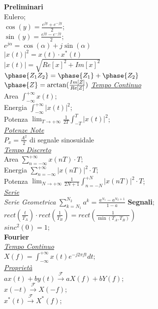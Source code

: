 \documentclass[a4paper]{article}
\begin{document}
\begin{multicols*}{3}
\textbf{Preliminari} \\
Eulero; \\
$\cos(y)=\frac{e^{jy} + e^{-jy}}{2}$; \\
$\sin(y)=\frac{e^{jy} - e^{-jy}}{2}$; \\
$e^{j\alpha}=\cos(\alpha)+j\sin(\alpha)$ \\
$|x(t)|^2=x(t)\cdot x^*(t)$\\
$|x(t)|=\sqrt{{Re[x]}^{2} + {Im[x]}^{2}}$ \\
$\phase{Z_1 Z_2} = \phase{Z_1}+\phase{Z_2}$ \\
$\phase{Z}=\arctan(\frac{Im[Z]}{Re[Z]})$
\underline{\textit{Tempo Continuo}} \\
Area $\int_{-\infty}^{+\infty} x(t)$; \\
Energia $\int_{-\infty}^{+\infty} |x(t)|^2$; \\
Potenza 
$\lim_{T \to +\infty}\frac{1}{2T}\int_{-T}^{T}|x(t)|^2$; \\
\underline{\textit{Potenze Note}} \\
$P_x=\frac{{A}^{2}}{2}$ di segnale sinosuidale\\
\underline{\textit{Tempo Discreto}} \\
Area $\sum_{n=-\infty}^{+\infty} x(nT) \cdot T$; \\
Energia $\sum_{n=-\infty}^{+\infty}|x(nT)|^2\cdot T$; \\
Potenza
$\lim_{N \to +\infty}{\frac{1}{2N + 1}\int_{n=-N}^{+N}|x(nT)|^2\cdot T}$; \\
\underline{\textit{Serie}} \\
\textit{Serie Geometrica}
$\sum_{k=N_1}^{N_2}a^k=\frac{a^{N_1}-a^{N_2 + 1}}{1-a}$
\textbf{Segnali}; \\
$rect(\frac{t}{T_A})\cdot rect(\frac{1}{T_B})=rect(\frac{1}{\min(T_A,T_B)})$ \\
$sinc^2(0) = 1$;\\
\textbf{Fourier} \\
\underline{\textit{Tempo Continuo}} \\
$X(f) = \int_{-\infty}^{+\infty} x(t) e^{-j2\pi ft} dt$; \\
\underline{\textit{Proprietà}} \\
$ax(t) + by(t) \xrightarrow{\mathscr{F}} aX(f) + bY(f)$; \\
$x(-t) \xrightarrow{\mathscr{F}} X(-f)$; \\
$x^{*}(t) \xrightarrow{\mathscr{F}} X^{*}(f)$; \\

\end{multicols*}
\end{document}
